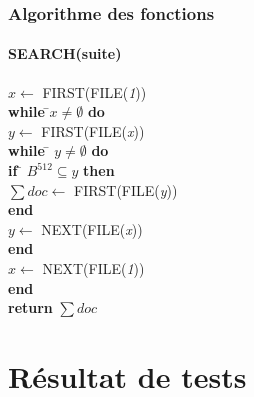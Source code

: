 \documentclass[hyperref={pdfpagemode=FullScreen,colorlinks=true},xcolor=pst,dvips]{beamer}\usepackage[french]{babel}
\begin{document}
	\begin{frame}[shrink]
		\frametitle{Algorithme des fonctions}
		\framesubtitle{SEARCH(suite)}
		\begin{framed}
			\begin{tabbing}
				$x \leftarrow$ FIRST(FILE(\textit{1}))\\
				\textbf{while }\=$x \neq \emptyset$\textbf{ do}\\
					\> $y \leftarrow $ FIRST(FILE(\textit{x}))\\
					\> \textbf{while }\= $y \neq \emptyset$\textbf{ do}\\
					\> \> \textbf{if }\= $B^{512} \subseteq y$\textbf{ then}\\
					\> \> \> $\sum doc \leftarrow$ FIRST(FILE(\textit{y}))\\
					\> \> \textbf{end}\\
					\> \> $y \leftarrow$ NEXT(FILE(\textit{x}))\\
					\> \textbf{end}\\
					\> $x \leftarrow$ NEXT(FILE(\textit{1}))\\
				\textbf{end}\\
				\textbf{return} $\sum doc$
			\end{tabbing}
		\end{framed}
	\end{frame}
	
	\section{Résultat de tests}
	\begin{frame}
		
	\end{frame}
	
\end{document}
